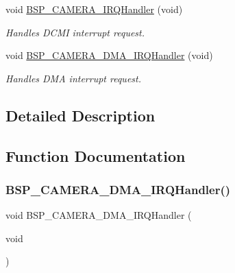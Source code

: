 \begin{DoxyCompactItemize}
void \hyperlink{group___c_a_m_e_r_a___m_o_d_u_l_e___functions_ga23ee2565a63761a4c740d9805d6c35b4}{B\+S\+P\+\_\+\+C\+A\+M\+E\+R\+A\+\_\+\+I\+R\+Q\+Handler} (void)
\begin{DoxyCompactList}\small\item\em Handles D\+C\+MI interrupt request. \end{DoxyCompactList}\item 
void \hyperlink{group___c_a_m_e_r_a___m_o_d_u_l_e___functions_gac6fe6acda16e566362b2281a855871ca}{B\+S\+P\+\_\+\+C\+A\+M\+E\+R\+A\+\_\+\+D\+M\+A\+\_\+\+I\+R\+Q\+Handler} (void)
\begin{DoxyCompactList}\small\item\em Handles D\+MA interrupt request. \end{DoxyCompactList}\end{DoxyCompactItemize}


\subsection{Detailed Description}


\subsection{Function Documentation}
\mbox{\label{group___c_a_m_e_r_a___m_o_d_u_l_e___functions_gac6fe6acda16e566362b2281a855871ca}} 
\subsubsection{\texorpdfstring{B\+S\+P\+\_\+\+C\+A\+M\+E\+R\+A\+\_\+\+D\+M\+A\+\_\+\+I\+R\+Q\+Handler()}{BSP\_CAMERA\_DMA\_IRQHandler()}}
{\footnotesize\ttfamily void B\+S\+P\+\_\+\+C\+A\+M\+E\+R\+A\+\_\+\+D\+M\+A\+\_\+\+I\+R\+Q\+Handler (\begin{DoxyParamCaption}\item[{void}]{ }\end{DoxyParamCaption})}



